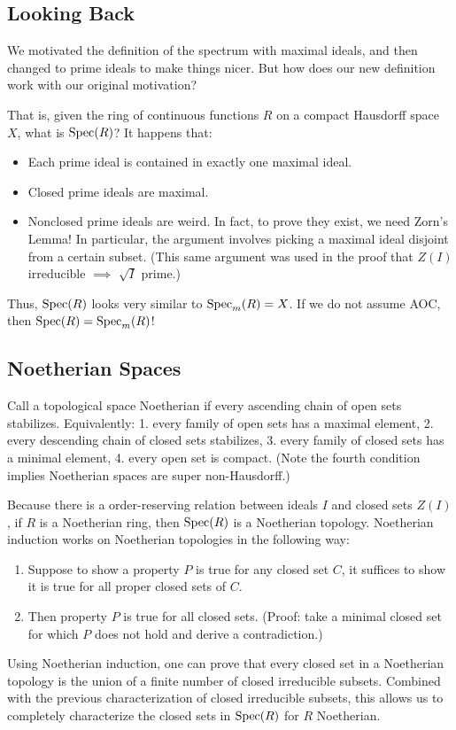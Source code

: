 \subsection{Looking Back}
We motivated the definition of the spectrum with maximal ideals, and then changed to prime ideals to make things nicer. But how does our new definition work with our original motivation?

That is, given the ring of continuous functions $R$ on a compact Hausdorff space $X$, what is $\operatorname{Spec}(R)$? It happens that:
\begin{itemize}
    \item Each prime ideal is contained in exactly one maximal ideal.
    \item Closed prime ideals are maximal.
    \item Nonclosed prime ideals are weird. In fact, to prove they exist, we need Zorn's Lemma! In particular, the argument involves picking a maximal ideal disjoint from a certain subset. (This same argument was used in the proof that $Z(I)$ irreducible $\implies$ $\sqrt{I}$ prime.)
\end{itemize}
Thus, $\operatorname{Spec}(R)$ looks very similar to $\operatorname{Spec}_m(R) = X$. If we do not assume AOC, then $\operatorname{Spec}(R) = \operatorname{Spec}_m(R)$!

\subsection{Noetherian Spaces}
Call a topological space Noetherian if every ascending chain of open sets stabilizes. Equivalently: 1. every family of open sets has a maximal element, 2. every descending chain of closed sets stabilizes, 3. every family of closed sets has a minimal element, 4. every open set is compact. (Note the fourth condition implies Noetherian spaces are super non-Hausdorff.)

Because there is a order-reserving relation between ideals $I$ and closed sets $Z(I)$, if $R$ is a Noetherian ring, then $\operatorname{Spec}(R)$ is a Noetherian topology. Noetherian induction works on Noetherian topologies in the following way:
\begin{enumerate}
    \item Suppose to show a property $P$ is true for any closed set $C$, it suffices to show it is true for all proper closed sets of $C$.
    \item Then property $P$ is true for all closed sets. (Proof: take a minimal closed set for which $P$ does not hold and derive a contradiction.)
\end{enumerate}
Using Noetherian induction, one can prove that every closed set in a Noetherian topology is the union of a finite number of closed irreducible subsets. Combined with the previous characterization of closed irreducible subsets, this allows us to completely characterize the closed sets in $\operatorname{Spec}(R)$ for $R$ Noetherian.

